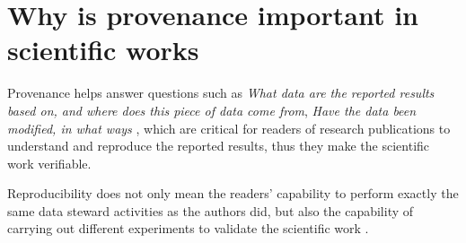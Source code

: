 \section{Why is provenance important in scientific works}
Provenance helps answer questions such as \emph{What data are the reported results based on, and where does this piece of data come from}, \emph{Have the data been modified, in what ways} \cite{davidson2008provenance}, which are critical for readers of research publications to understand and reproduce the reported results, thus they make the scientific work verifiable. 

Reproducibility does not only mean the readers' capability to perform exactly the same data steward activities as the authors did, but also the capability of carrying out different experiments to validate the scientific work \cite{drummond2009replicability}. 




